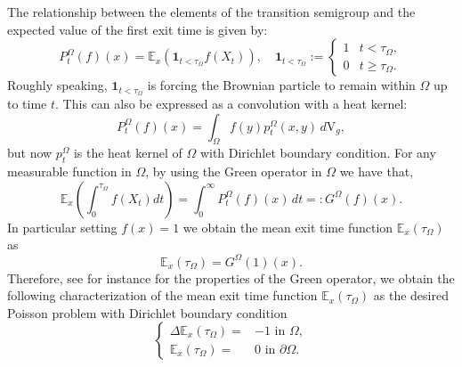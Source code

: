 \documentclass{amsart}
\theoremstyle{definition}
\theoremstyle{remark}
\begin{document}
The relationship between the elements of the transition semigroup and the expected value of the first exit time is given by:
$$
P^\Omega_t(f)(x) = \mathbb{E}_x (\mathbf{1}_{t < \tau_\Omega} f(X_t)),\quad\mathbf{1}_{t < \tau_\Omega}:=\left\{\begin{array}{cc}
  1   & t < \tau_\Omega,\\
  0   & t\geq \tau_\Omega.
\end{array}\right.
$$
Roughly speaking, $\mathbf{1}_{t < \tau_\Omega}$ is forcing  the Brownian particle to remain within $\Omega$ up to time $t$. This can also be expressed as a convolution with a heat kernel:
$$
P^\Omega_t(f)(x) = \int_\Omega f(y) p_t^\Omega(x, y) \, d\mathrm{V}_g,
$$
but now  $p_t^\Omega$ is the heat kernel of $\Omega$ with Dirichlet boundary condition. For any measurable function in $\Omega$, by using the Green operator in $\Omega$ we have that, 
$$
\mathbb{E}_x\left(\int_{0}^{\tau_\Omega} f(X_t)dt\right)=\int_{0}^\infty P^\Omega_t(f)(x) \, dt=:G^\Omega(f)(x).
$$
In particular setting $f(x)=1$ we obtain the mean exit time function $\mathbb{E}_x(\tau_\Omega)$ as
\begin{equation}
   \mathbb{E}_x(\tau_\Omega)=G^\Omega(1)(x).
\end{equation}
Therefore, see for instance  \cite{Bessa2020} for the properties of the Green operator, we obtain the following characterization of the mean exit time function $\mathbb{E}_x(\tau_\Omega)$  as  the desired Poisson problem with Dirichlet boundary condition 
\begin{equation*}
    \left\lbrace
\begin{aligned}
    \Delta  \mathbb{E}_x(\tau_\Omega) =&-1 \text{ in } \Omega,\\
    { \mathbb{E}_x(\tau_\Omega)}=&0\text{ in } \partial\Omega.
\end{aligned}
\right.
\end{equation*}
\end{document}
